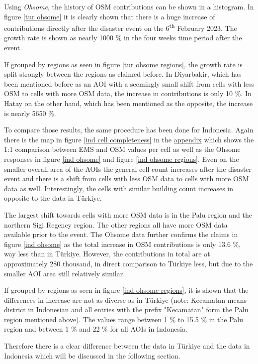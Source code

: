 \documentclass[oneside,twocolumn,10pt,cleanfoot,cleanhead]{asme2ej}
\begin{document}
Using \textit{Ohsome}, the history of OSM contributions can be shown in a histogram.
In figure \ref{tur ohsome} it is clearly shown that there is a huge increase of contributions directly after the disaster event on the 6\textsuperscript{th} February 2023.
The growth rate is shown as nearly 1000 \% in the four weeks time period after the event.

If grouped by regions as seen in figure \ref{tur ohsome regions}, the growth rate is split strongly between the regions as claimed before.
In Diyarbakir, which has been mentioned before as an AOI with a seemingly small shift from cells with less OSM to cells with more OSM data, the increase in contributions is only 10 \%.
In Hatay on the other hand, which has been mentioned as the opposite, the increase is nearly 5650 \%.

To compare those results, the same procedure has been done for Indonesia.
Again there is the map in figure \ref{ind cell completeness} in the \hyperref[appendix]{appendix} which shows the 1:1 comparison between EMS and OSM values per cell as well as the Ohsome responses in figure \ref{ind ohsome} and figure \ref{ind ohsome regions}.
Even on the smaller overall area of the AOIs the general cell count increases after the disaster event and there is a shift from cells with less OSM data to cells with more OSM data as well.
Interestingly, the cells with similar building count increases in opposite to the data in Türkiye. 

The largest shift towards cells with more OSM data is in the Palu region and the northern Sigi Regency region.
The other regions all have more OSM data available prior to the event.
The Ohsome data further confirms the claims in figure \ref{ind ohsome} as the total increase in OSM contributions is only 13.6 \%, way less than in Türkiye.
However, the contributions in total are at approximately 280 thousand, in direct comparison to Türkiye less, but due to the smaller AOI area still relatively similar. 

If grouped by regions as seen in figure \ref{ind ohsome regions}, it is shown that the differences in increase are not as diverse as in Türkiye (note: Kecamatan means district in Indonesian and all entries with the prefix "Kecamatan" form the Palu region mentioned above).
The values range between 1 \% to 15.5 \% in the Palu region and between 1 \% and 22 \% for all AOIs in Indonesia.

Therefore there is a clear difference between the data in Türkiye and the data in Indonesia which will be discussed in the following section.
\end{document}
